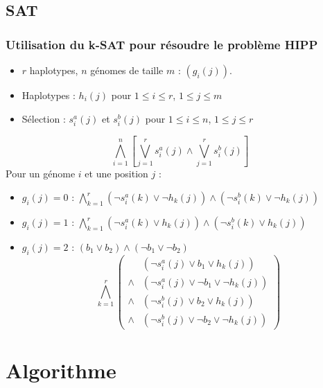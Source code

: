 \documentclass{beamer}
\begin{document}
\subsection{SAT}
\begin{frame}
    \frametitle{Utilisation du k-SAT pour résoudre le problème HIPP}
    \begin{itemize}
        \item $r$ haplotypes, $n$ génomes de taille $m$ : $(g_i(j))$.
        \item Haplotypes : $h_i(j)$ pour $1\leq i\leq r$, $1\leq j\leq m$
        \item Sélection : $s^a_i(j)$ et $s^b_i(j)$ pour $1\leq i\leq n$, $1\leq j\leq r$
    \end{itemize}
    \[ \bigwedge_{i=1}^n\left[\bigvee_{j=1}^r s^a_i(j) \wedge \bigvee_{j=1}^r s^b_i(j)\right] \]
    Pour un génome $i$ et une position $j$ : \begin{itemize}
        \item $g_i(j) = 0$ : $\bigwedge_{k=1}^r (\neg s^a_i(k)\vee \neg h_k(j)) \wedge (\neg s^b_i(k)\vee \neg h_k(j))$
        \item $g_i(j) = 1$ : $\bigwedge_{k=1}^r (\neg s^a_i(k)\vee h_k(j)) \wedge (\neg s^b_i(k)\vee h_k(j))$
        \item $g_i(j) = 2$ : $(b_1\vee b_2) \wedge (\neg b_1\vee \neg b_2)$
            \[\bigwedge_{k=1}^r \left(\begin{array}{cl}
                        & (\neg s^a_i(j)\vee b_1 \vee h_k(j)) \\
                 \wedge & (\neg s^a_i(j)\vee \neg b_1\vee \neg h_k(j)) \\
                 \wedge & (\neg s^b_i(j)\vee b_2 \vee h_k(j)) \\
                 \wedge & (\neg s^b_i(j)\vee \neg b_2 \vee \neg h_k(j))
            \end{array}\right)\]
    \end{itemize}
\end{frame}

\section{Algorithme}
\end{document}
